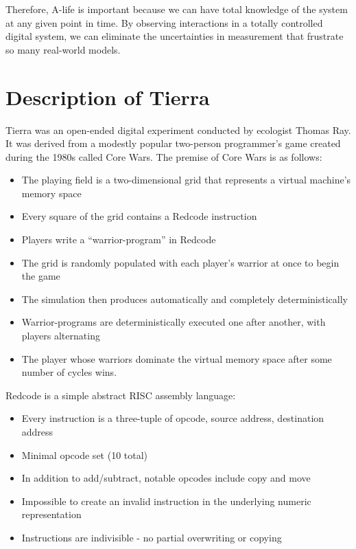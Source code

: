 \documentclass[11pt, twocolumn]{article}
\begin{document}
Therefore, A-life is important because we can have total knowledge of the system at any given point in time. By observing interactions in a totally controlled digital system, we can eliminate the uncertainties in measurement that frustrate so many real-world models.

\section{Description of Tierra}
Tierra was an open-ended digital experiment conducted by ecologist Thomas Ray. It was derived from a modestly popular two-person programmer's game created during the 1980s called Core Wars. The premise of Core Wars is as follows:

\begin{itemize}
\item The playing field is a two-dimensional grid that represents a virtual machine's memory space
\item Every square of the grid contains a Redcode instruction
\item Players write a ``warrior-program'' in Redcode
\item The grid is randomly populated with each player's warrior at once to begin the game
\item The simulation then produces automatically and completely deterministically
\item Warrior-programs are deterministically executed one after another, with players alternating 
\item The player whose warriors dominate the virtual memory space after some number of cycles wins.
\end{itemize}

Redcode \cite{Redcode} is a simple abstract RISC assembly language:

\begin{itemize}
\item Every instruction is a three-tuple of opcode, source address, destination address
\item Minimal opcode set (10 total)
\item In addition to add/subtract, notable opcodes include copy and move
\item Impossible to create an invalid instruction in the underlying numeric representation
\item Instructions are indivisible - no partial overwriting or copying
\end{itemize}
\end{document}
